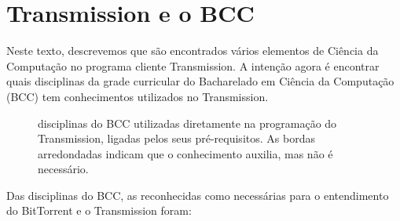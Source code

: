 
\chapter{Transmission e o BCC}
\label{chap:bcc}

Neste texto, descrevemos que são encontrados vários elementos de Ciência da Computação
no programa cliente Transmission. A intenção agora é encontrar quais disciplinas da
grade curricular do Bacharelado em Ciência da Computação (BCC) tem conhecimentos
utilizados no Transmission.

\begin{figure}[H]
    \centering
    \caption{disciplinas do BCC utilizadas diretamente na programação do Transmission,
    ligadas pelos seus pré-requisitos. As bordas arredondadas indicam que o
    conhecimento auxilia, mas não é necessário.}
    \label{fig:bcc}
\end{figure}

Das disciplinas do BCC, as reconhecidas como necessárias para o entendimento do
BitTorrent e o Transmission foram:

